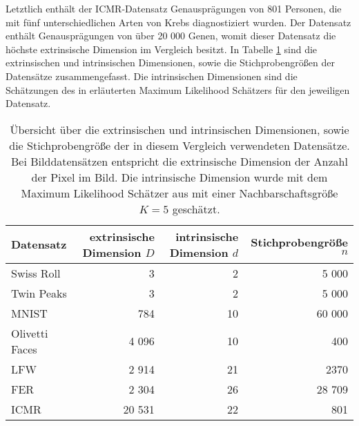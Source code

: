 Letztlich enthält der ICMR-Datensatz Genausprägungen von 801 Personen, die mit fünf
unterschiedlichen Arten von Krebs diagnostiziert wurden. Der Datensatz enthält Genausprägungen von
über 20 000 Genen, womit dieser Datensatz die höchste extrinsische Dimension im Vergleich besitzt.
In Tabelle \ref{tab:uebersicht-datensaetze} sind die extrinsischen und intrinsischen Dimensionen,
sowie die Stichprobengrößen der Datensätze zusammengefasst. Die intrinsischen Dimensionen sind die
Schätzungen des in 
erläuterten Maximum Likelihood Schätzers für den jeweiligen Datensatz.

\begin{table}[]
	\centering
	\begin{tabular}{@{}lrrr@{}}
		\toprule
		Datensatz      & extrinsische Dimension $D$ & intrinsische Dimension $d$ & Stichprobengröße $n$ \\ \midrule
		Swiss Roll     & 3                          & 2                          & 5 000                \\
		Twin Peaks     & 3                          & 2                          & 5 000                \\
		MNIST          & 784                        & 10                         & 60 000               \\
		Olivetti Faces & 4 096                      & 10                         & 400                  \\
		LFW            & 2 914                      & 21                         & 2370                 \\
		FER            & 2 304                      & 26                         & 28 709               \\
		ICMR           & 20 531                     & 22                         & 801                  \\
		\bottomrule
	\end{tabular}
	\caption[Übersicht über die extrinsischen und intrinsischen Dimensionen, sowie die Stichprobengröße der in diesem Vergleich verwendeten Datensätze]{Übersicht über die extrinsischen und intrinsischen Dimensionen, sowie die Stichprobengröße der in diesem Vergleich verwendeten Datensätze. Bei Bilddatensätzen entspricht die extrinsische Dimension der Anzahl der Pixel im Bild. Die intrinsische Dimension wurde mit dem Maximum Likelihood Schätzer aus  mit einer Nachbarschaftsgröße $K=5$ geschätzt.}
	\label{tab:uebersicht-datensaetze}
\end{table}

